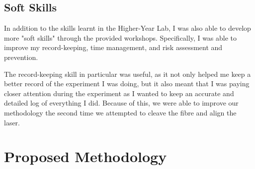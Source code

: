 \documentclass{article}
\begin{document}
\subsection{Soft Skills}
In addition to the skills learnt in the Higher-Year Lab, I was also able to develop more "soft skills" through the provided workshops. Specifically, I was able to improve my record-keeping, time management, and risk assessment and prevention.

The record-keeping skill in particular was useful, as it not only helped me keep a better record of the experiment I was doing, but it also meant that I was paying closer attention during the experiment as I wanted to keep an accurate and detailed log of everything I did. Because of this, we were able to improve our methodology the second time we attempted to cleave the fibre and align the laser.

\section{Proposed Methodology}
\end{document}
